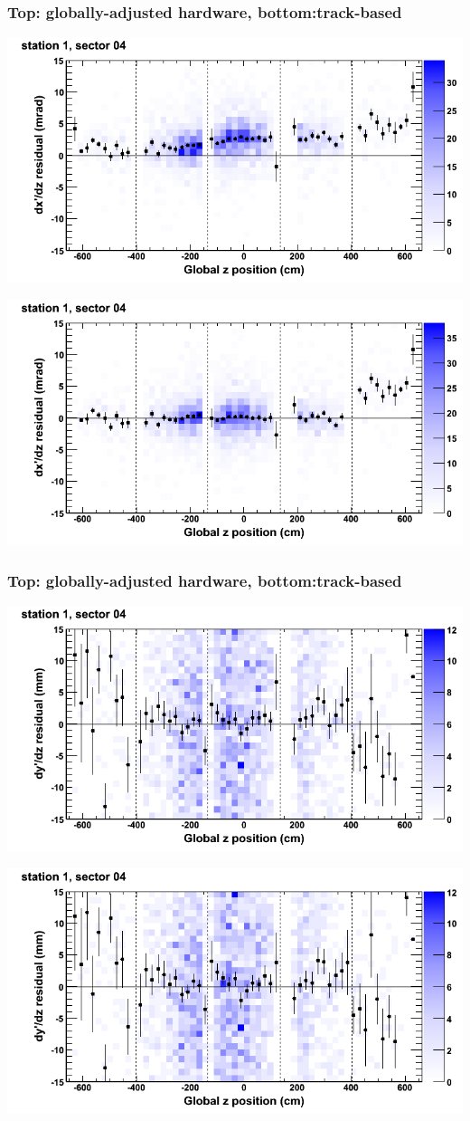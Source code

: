 \documentclass[compress]{beamer}
\begin{document}
\begin{frame}
\frametitle{Top: globally-adjusted hardware, bottom:track-based}
\includegraphics[width=0.7\linewidth]{NOV4_mapplots_HW/DTvsz_st1sec04_dxdz.png}

\includegraphics[width=0.7\linewidth]{NOV4_mapplots/DTvsz_st1sec04_dxdz.png}
\end{frame}

\begin{frame}
\frametitle{Top: globally-adjusted hardware, bottom:track-based}
\includegraphics[width=0.7\linewidth]{NOV4_mapplots_HW/DTvsz_st1sec04_dydz.png}

\includegraphics[width=0.7\linewidth]{NOV4_mapplots/DTvsz_st1sec04_dydz.png}
\end{frame}
\end{document}
